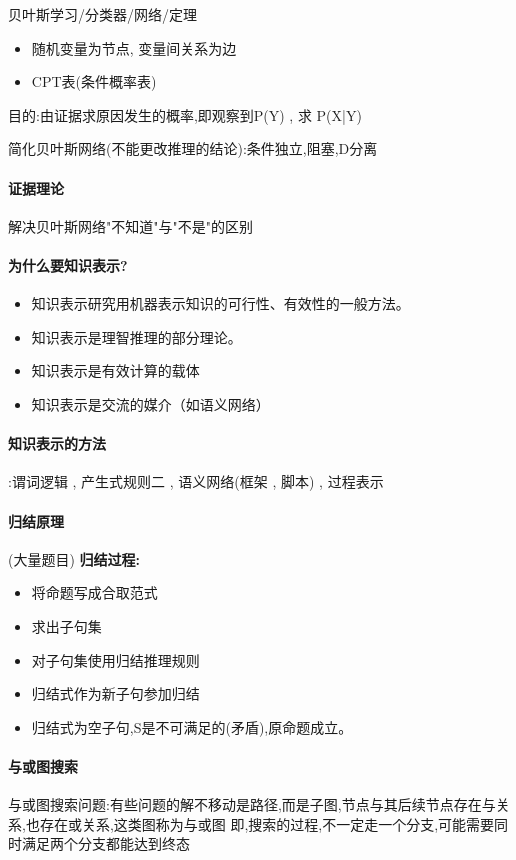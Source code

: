 \documentclass[UTF8,a4paper]{ctexart}
\begin{document}
贝叶斯学习/分类器/网络/定理

\begin{itemize}
	\item 随机变量为节点, 变量间关系为边
	\item CPT表(条件概率表)
\end{itemize}
目的:由证据求原因发生的概率,即观察到P(Y) , 求 P(X|Y)

简化贝叶斯网络(不能更改推理的结论):条件独立,阻塞,D分离


\paragraph{证据理论}解决贝叶斯网络"不知道"与"不是"的区别

\paragraph{为什么要知识表示?}
\begin{itemize}
	\item 知识表示研究用机器表示知识的可行性、有效性的一般方法。
	\item 知识表示是理智推理的部分理论。
	\item 知识表示是有效计算的载体
	\item 知识表示是交流的媒介（如语义网络）
\end{itemize}

\paragraph{知识表示的方法}:谓词逻辑 , 产生式规则二 , 语义网络(框架 , 脚本) , 过程表示

\paragraph{归结原理} (大量题目)
\textbf{归结过程:}
\begin{itemize}
	\item 将命题写成合取范式
	\item 求出子句集
	\item 对子句集使用归结推理规则
	\item 归结式作为新子句参加归结
	\item 归结式为空子句,S是不可满足的(矛盾),原命题成立。
\end{itemize}


\paragraph{与或图搜索}
与或图搜索问题:有些问题的解不移动是路径,而是子图,节点与其后续节点存在与关系,也存在或关系,这类图称为与或图
即,搜索的过程,不一定走一个分支,可能需要同时满足两个分支都能达到终态
\end{document}
